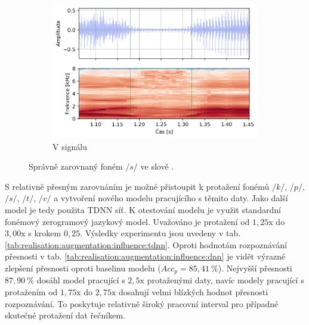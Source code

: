 \begin{figure}[htpb]
\begin{subfigure}[b]{0.65\textwidth}
    \includegraphics[width=\textwidth]{./ch6-realisation/img/energy_spec_word-segment-2.png}
    \caption{V signálu}
    \label{fig:realisation:augmentation:alignemnt:correct:audio}
  \end{subfigure}
  \caption{Správně zarovnaný foném $/s/$ ve slově .}
  \label{fig:realisation:augmentation:alignemnt:correct}
\end{figure}

S relativně přesným zarovnáním je možné přistoupit k protažení fonémů $/k/$, $/p/$, $/s/$, $/t/$, $/v/$ a vytvoření nového modelu pracujícího s těmito daty.
Jako další model je tedy použita TDNN síť.
K otestování modelu je využit standardní fonémový zerogramový jazykový model.
Uvažováno je protažení od $1,25\mathrm{x}$ do $3,00\mathrm{x}$ s krokem $0,25$. Výsledky experimentu jsou uvedeny v tab. \ref{tab:realisation:augmentation:influence:tdnn}.
Oproti hodnotám rozpoznávání přesnosti v tab. \ref{tab:realisation:augmentation:influence:dnn} je vidět výrazné zlepšení přesnosti oproti baselinu modelu ($Acc_{p} = 85,41\ \%$).
Nejvyšší přesnosti $87,90\ \%$ dosáhl model pracující s $2,5\mathrm{x}$ protaženými daty, navíc modely pracující s protažením od $1,75\mathrm{x}$ do $2,75\mathrm{x}$ dosahují velmi blízkých hodnot přesnosti rozpoznávání.
To poskytuje relativně široký pracovní interval pro případné skutečné protažení dat řečníkem.

